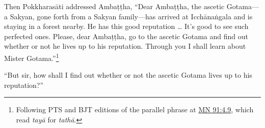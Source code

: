 \documentclass[12pt,openany]{book}%
\begin{document}
Then \textsanskrit{Pokkharasāti} addressed \textsanskrit{Ambaṭṭha}, “Dear \textsanskrit{Ambaṭṭha}, the ascetic Gotama—a Sakyan, gone forth from a Sakyan family—has arrived at \textsanskrit{Icchānaṅgala} and is staying in a forest nearby. He has this good reputation … It’s good to see such perfected ones. Please, dear \textsanskrit{Ambaṭṭha}, go to the ascetic Gotama and find out whether or not he lives up to his reputation. Through you I shall learn about Mister Gotama.”\footnote{Following PTS and BJT editions of the parallel phrase at \href{https://suttacentral.net/mn91/en/sujato\#4.9}{MN 91:4.9}, which read \textit{\textsanskrit{tayā}} for \textit{\textsanskrit{tathā}}. } 

“But sir, how shall I find out whether or not the ascetic Gotama lives up to his reputation?” 
\end{document}
